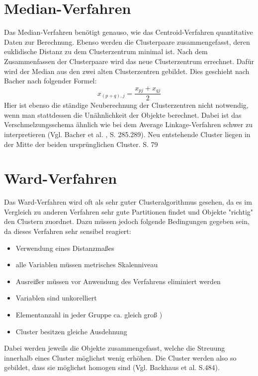 \section{Median-Verfahren}
Das Median-Verfahren benötigt genauso, wie das Centroid-Verfahren quantitative Daten zur Berechnung. Ebenso werden die Clusterpaare zusammengefasst, deren euklidische Distanz zu dem Clusterzentrum minimal ist. Nach dem Zusammenfassen der Clusterpaare wird das neue Clusterzentrum errechnet. Dafür wird der Median aus den zwei alten Clusterzentren gebildet. Dies geschieht nach Bacher \cite{Bacher.2010} nach folgender Formel:
\begin{equation}
	x_{(p+q),j} = \frac{x_{pj} + x_{qj}}{2}
\end{equation}
Hier ist ebenso die ständige Neuberechnung der Clusterzentren nicht notwendig, wenn man stattdessen die Unähnlichkeit der Objekte berechnet. Dabei ist das Verschmelzungsschema ähnlich wie bei dem Average Linkage-Verfahren schwer zu interpretieren (Vgl. Bacher et al. \cite{Bacher.2010}, S. 285.289). Neu entstehende Cluster liegen in der Mitte der beiden ursprünglichen Cluster. \cite{Everitt.2011} S. 79

\section{Ward-Verfahren}
Das Ward-Verfahren wird oft als sehr guter Clusteralgorithmus gesehen, da es im Vergleich zu anderen Verfahren sehr gute Partitionen findet und Objekte "richtig" den Clustern zuordnet. Dazu müssen jedoch folgende Bedingungen gegeben sein, da dieses Verfahren sehr sensibel reagiert: 

\begin{itemize}
	\item Verwendung eines Distanzmaßes
	\item alle Variablen müssen metrisches Skalenniveau \item Ausreißer müssen vor Anwendung des Verfahrens eliminiert werden
	\item Variablen sind unkorelliert
	\item Elementanzahl in jeder Gruppe ca. gleich groß )
	\item Cluster besitzen gleiche Ausdehnung
\end{itemize}

Dabei werden jeweils die Objekte zusammengefasst, welche die Streuung innerhalb eines Cluster möglichst wenig erhöhen. Die Cluster werden also so gebildet, dass sie möglichst homogen sind (Vgl. Backhaus et al. \cite{Backhaus.2016} S.484).

